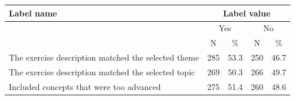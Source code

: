 \begin{tabularx}{\textwidth}{Xcccc}
\toprule
    Label name & \multicolumn{4}{c}{Label value} \\
    \midrule
    & \multicolumn{2}{c}{Yes} & \multicolumn{2}{c}{No} \\
    & N & \% & N & \% \\
    \midrule
    The exercise description matched the selected theme & 285 & 53.3 & 250 & 46.7 \\
    The exercise description matched the selected topic & 269 & 50.3 & 266 & 49.7 \\
    Included concepts that were too advanced & 275 & 51.4 & 260 & 48.6 \\
    \bottomrule
\end{tabularx}